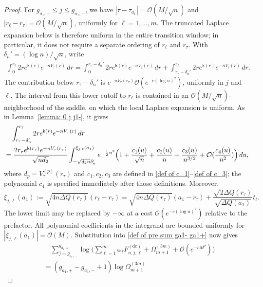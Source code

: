 \documentclass[a4paper]{article}
\numberwithin{equation}{section}
\begin{document}
\begin{proof}
For $g_{a_1,-}\leq j\leq g_{a_1,+}$, we have
$|\tau-\tau_{a_1}|=\mathcal{O}(M/\sqrt n)$ and
$|r_\ell-r_\tau|=\mathcal{O}(M/\sqrt n)$, uniformly for
$\ell=1,\ldots,m$.  The truncated Laplace expansion below is therefore
uniform in the entire transition window; in particular, it does not require
a separate ordering of $r_\ell$ and $r_\tau$.  With
$\delta_n'=(\log n)/\sqrt n$, write
\begin{align*}
\int_0^{r_{\ell}}2re^{\mathsf{k}(r)}e^{-nV_{\tau}(r)}\,dr
=\int_{0}^{r_{\tau}-\delta_n'}2re^{\mathsf{k}(r)}e^{-nV_{\tau}(r)}\,dr
+\int_{r_{\tau}-\delta_n'}^{r_{\ell}} 2re^{\mathsf{k}(r)}e^{-nV_{\tau}(r)}\,dr.   
\end{align*}
The contribution below $r_\tau-\delta_n'$ is
$e^{-nV_{\tau}(r_{\tau})}\mathcal{O}(e^{-c(\log n)^2})$, uniformly in $j$
and $\ell$.  The interval from this lower cutoff to $r_\ell$ is contained in
an $\mathcal{O}(M/\sqrt n)$-neighborhood of the saddle, on which the local
Laplace expansion is uniform.  As in Lemma~\ref{lemma: 0 j j1-}, it gives
\begin{align*}
&\quad 
\int_{r_{\tau}-\delta_n'}^{r_{\ell}} 2re^{\mathsf{k}(r)}e^{-nV_{\tau}(r)}\,dr
\\
&=
\frac{2r_{\tau}e^{\mathsf{k}(r_{\tau})}e^{-nV_{\tau}(r_{\tau})}}{\sqrt{nd_2}}\int_{-\sqrt{d_2n}\delta_n'}^{\xi_{j,\ell}(a_1)}
e^{-\frac{1}{2}u^2}
\Bigl( 
1+\frac{c_1(u)}{\sqrt{n}}+\frac{c_2(u)}{n}+\frac{c_3(u)}{n^{3/2}}+\mathcal{O}(\frac{c_4(u)}{n^2})
\Bigr)\,du,
\end{align*}
where $d_p=V_\tau^{(p)}(r_\tau)$ and $c_1,c_2,c_3$ are defined in
\eqref{def of c_1}--\eqref{def of c_3}; the polynomial $c_4$ is specified
immediately after those definitions.  Moreover,
\begin{equation}
 \xi_{j,\ell}(a_1)
 :=
\sqrt{4n \Delta Q(r_{\tau})}(r_{\ell}-r_{\tau})
 =
 \sqrt{4n\Delta Q(r_{\tau})}(a_1-r_{\tau})+\frac{\sqrt{2\Delta Q(r_{\tau})}}{\sqrt{\Delta Q(a_1)}}t_{\ell}. 
\end{equation}
The lower limit may be replaced by $-\infty$ at a cost
$\mathcal{O}(e^{-c(\log n)^2})$ relative to the prefactor.  All polynomial
coefficients in the integrand are bounded uniformly for
$|\xi_{j,\ell}(a_1)|=\mathcal{O}(M)$.  Substitution into
\eqref{def of pre sum ga1- ga1+} now gives
\begin{align*}
&\quad 
    \sum_{j=g_{a_1,-}}^{g_{a_1,+}}
        \log\Big( 
\sum_{\ell=1}^{m}\omega_{\ell}F_{n,j,\ell}^{(\mathrm{dc})}
+\Omega_{m+1}^{(3m)}+\mathcal{O}(e^{-cM^2})
\Bigr)
\\
&=
(g_{a_1,+}-g_{a_1,-}+1)\log \Omega_{m+1}^{(3m)}

\end{align*}
\end{proof}
\end{document}
